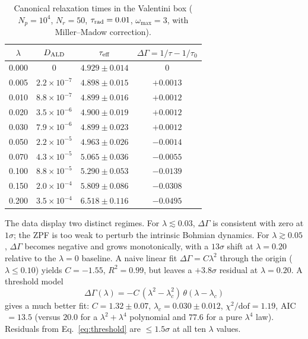 \documentclass[aps,prl,twocolumn,superscriptaddress]{revtex4-2}
\newcommand{\taur}{\tau_{\rm rad}}
\newcommand{\Dald}{D_{\rm ALD}}
\begin{document}
\begin{table}[h]
\caption{Canonical relaxation times in the Valentini box
($N_p = 10^4$, $N_r = 50$, $\taur = 0.01$, $\omega_{\max} = 3$,
with Miller--Madow correction).}
\label{tab:taueff}
\begin{ruledtabular}
\begin{tabular}{cccc}
$\lambda$ & $\Dald$ & $\tau_{\rm eff}$ & $\Delta\Gamma = 1/\tau - 1/\tau_0$ \\
\hline
0.000 & 0                 & $4.929 \pm 0.014$ & 0           \\
0.005 & $2.2\times10^{-7}$ & $4.898 \pm 0.015$ & $+0.0013$   \\
0.010 & $8.8\times10^{-7}$ & $4.899 \pm 0.016$ & $+0.0012$   \\
0.020 & $3.5\times10^{-6}$ & $4.900 \pm 0.019$ & $+0.0012$   \\
0.030 & $7.9\times10^{-6}$ & $4.899 \pm 0.023$ & $+0.0012$   \\
0.050 & $2.2\times10^{-5}$ & $4.963 \pm 0.026$ & $-0.0014$   \\
0.070 & $4.3\times10^{-5}$ & $5.065 \pm 0.036$ & $-0.0055$   \\
0.100 & $8.8\times10^{-5}$ & $5.290 \pm 0.053$ & $-0.0139$   \\
0.150 & $2.0\times10^{-4}$ & $5.809 \pm 0.086$ & $-0.0308$   \\
0.200 & $3.5\times10^{-4}$ & $6.518 \pm 0.116$ & $-0.0495$   \\
\end{tabular}
\end{ruledtabular}
\end{table}

The data display two distinct regimes.
For $\lambda \lesssim 0.03$, $\Delta\Gamma$ is consistent with zero at
$1\sigma$; the ZPF is too weak to perturb the intrinsic Bohmian dynamics.
For $\lambda \gtrsim 0.05$, $\Delta\Gamma$ becomes negative and grows
monotonically, with a $13\sigma$ shift at $\lambda = 0.20$ relative to
the $\lambda = 0$ baseline.
A naive linear fit $\Delta\Gamma = C\lambda^2$ through the origin
($\lambda \le 0.10$) yields $C = -1.55$, $R^2 = 0.99$, but leaves a
$+3.8\sigma$ residual at $\lambda = 0.20$.
A threshold model
\begin{equation}
  \Delta\Gamma(\lambda) = -C\,(\lambda^2 - \lambda_c^2)\,
                          \theta(\lambda - \lambda_c)
\label{eq:threshold}
\end{equation}
gives a much better fit:
$C = 1.32 \pm 0.07$, $\lambda_c = 0.030 \pm 0.012$, $\chi^2/\text{dof} = 1.19$,
AIC$\,= 13.5$ (versus $20.0$ for a $\lambda^2 + \lambda^4$ polynomial and
$77.6$ for a pure $\lambda^4$ law).
Residuals from Eq.~\eqref{eq:threshold} are $\le 1.5\sigma$ at all ten
$\lambda$ values.
\end{document}
